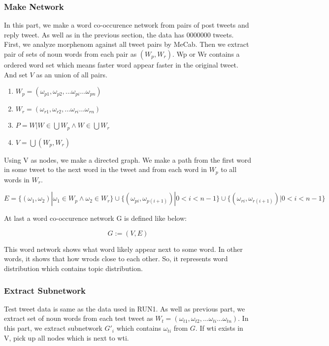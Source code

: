 \documentclass{sig-alternate}
\begin{document}
\subsubsection{Make Network}
In this part, we make a word co-occurence network from pairs of post tweets and reply tweet.
As well as in the previous section, the data has 0000000 tweets. 
First, we analyze morphenom against all tweet pairs by MeCab. Then we extract pair of sets of noun words from each pair as \((W_{p}, W_{r})\). Wp or Wr contains a ordered word set which means faster word appear faster in the original tweet. And set \(V\) as an union of all pairs.

\begin{enumerate}
    \item \(W_{p} = (\omega_{p1}, \omega_{p2}, ... \omega_{pi} ... \omega_{pn}) \)
    \item \(W_{r} = (\omega_{r1}, \omega_{r2}, ... \omega_{ri} ... \omega_{rn}) \)
    \item \(P = {W | W \in \bigcup W_{p} \wedge W \in \bigcup W_{r}}\)
    \item \(V = \bigcup (W_{p}, W_{r})\)
\end{enumerate}

Using V as nodes, we make a directed graph. We make a path from the first word in some tweet to the next word in the tweet and from each word in \( W_{p} \) to all words in \(W_{r} \).

\[E = \{(\omega_{1}, \omega_{2}) | \omega_{1}\in W_{p} \wedge \omega_{2}\in W_{r}\}
\cup \{(\omega_{pi}, \omega_{p(i+1)}) | 0 < i < n-1\}
\cup \{(\omega_{ri}, \omega_{r(i+1)}) | 0 < i < n-1\}
\]

At last a word co-occurence network G is defined like below:

\[G := (V,E)\]

This word network shows what word likely appear next to some word. In other words, it shows that how wrods close to each other. So, it represents word distribution which contains topic distribution.

\subsubsection{Extract Subnetwork}
Test tweet data is same as the data used in RUN1. As well as previous part, we extract set of noun words from each test tweet as \(W_{t} = (\omega_{t1}, \omega_{t2}, ... \omega_{ti} ... \omega_{tn})\).
In this part, we extract subnetwork $G'_{i}$ which contains \(\omega_{ti}\) from $G$.
If wti exists in V, pick up all nodes which is next to wti.
\end{document}

